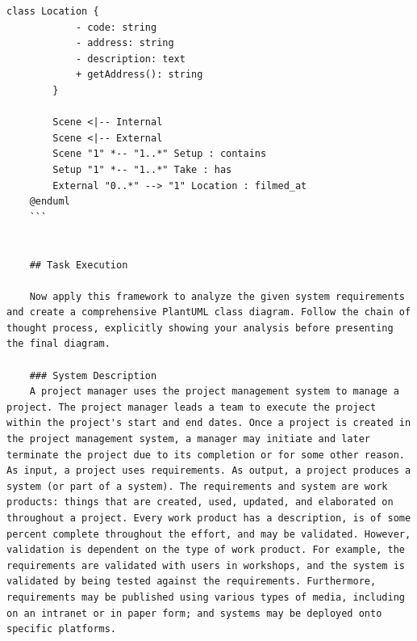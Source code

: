 \begin{lstlisting}[caption={Few-shot Chain-of-thought  Prompt}, label={lst:Few_shot_Chain_of_thought_Prompt},basicstyle=\ttfamily\tiny]
        class Location {
            - code: string
            - address: string
            - description: text
            + getAddress(): string
        }
        
        Scene <|-- Internal
        Scene <|-- External
        Scene "1" *-- "1..*" Setup : contains
        Setup "1" *-- "1..*" Take : has
        External "0..*" --> "1" Location : filmed_at
    @enduml
    ```


    ## Task Execution

    Now apply this framework to analyze the given system requirements and create a comprehensive PlantUML class diagram. Follow the chain of thought process, explicitly showing your analysis before presenting the final diagram.

    ### System Description
    A project manager uses the project management system to manage a project. The project manager leads a team to execute the project within the project's start and end dates. Once a project is created in the project management system, a manager may initiate and later terminate the project due to its completion or for some other reason. As input, a project uses requirements. As output, a project produces a system (or part of a system). The requirements and system are work products: things that are created, used, updated, and elaborated on throughout a project. Every work product has a description, is of some percent complete throughout the effort, and may be validated. However, validation is dependent on the type of work product. For example, the requirements are validated with users in workshops, and the system is validated by being tested against the requirements. Furthermore, requirements may be published using various types of media, including on an intranet or in paper form; and systems may be deployed onto specific platforms.

\end{lstlisting}
